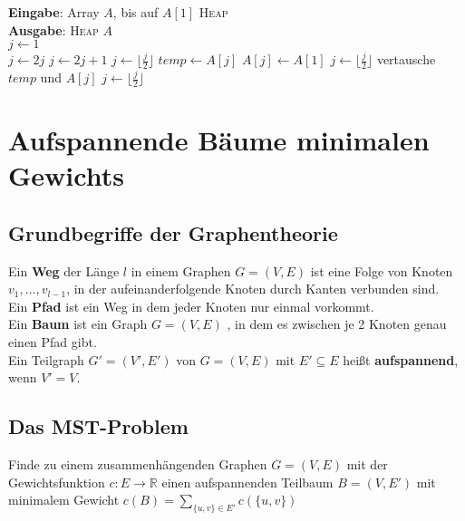 \documentclass[a4paper,10pt]{scrartcl}
\newcommand{\tbf}{\textbf}
\newcommand{\tsc}{\textsc}
\newcommand{\agn}{\leftarrow}
\newcommand{\Gr}{$G = (V,E)$ }
\newcommand{\Gwfkt}{$c: E \rightarrow \mathbb{R}$ }
\newcommand{\Eingabe}[1]{\STATE \tbf{Eingabe}: #1 \\}
\newcommand{\Ausgabe}[1]{\STATE \tbf{Ausgabe}: #1 \\}
\begin{document}
\begin{algorithm}
\caption{$\tsc{Bottom-Up-Heapify}(A,1)$ $\in O(\text{log } n)$}
\begin{algorithmic}
\Eingabe{Array $A$, bis auf $A[1]$ \tsc{Heap}}
\Ausgabe{\tsc{Heap} $A$}
\STATE $j \agn 1$ \\
		\STATE $j \agn 2j$
	\ELSE
		\STATE $j \agn 2j + 1$
	\ENDIF
\ENDWHILE
{}
	\STATE $j \agn \lfloor \frac{j}{2} \rfloor$
\ENDWHILE
\STATE $temp \agn A[j]$
\STATE $A[j] \agn A[1]$
\STATE $j \agn \lfloor \frac{j}{2} \rfloor$
	\STATE vertausche $temp$ und $A[j]$
	\STATE $j \agn \lfloor \frac{j}{2} \rfloor$
\ENDWHILE
\end{algorithmic}
\end{algorithm}


\newpage
\section{Aufspannende Bäume minimalen Gewichts}
\subsection{Grundbegriffe der Graphentheorie}

Ein \tbf{Weg} der Länge $l$ in einem Graphen \Gr ist eine Folge von Knoten $v_1, \ldots, v_{l-1}$, in der aufeinanderfolgende Knoten durch Kanten verbunden sind. \\

Ein \tbf{Pfad} ist ein Weg in dem jeder Knoten nur einmal vorkommt. \\

Ein \tbf{Baum} ist ein Graph \Gr, in dem es zwischen je 2 Knoten genau einen Pfad gibt. \\

Ein Teilgraph $G' = (V',E')$ von \Gr mit $E' \subseteq E$ heißt \tbf{aufspannend}, wenn $V' = V$. \\

\subsection{Das MST-Problem}
Finde zu einem zusammenhängenden Graphen \Gr mit der Gewichtsfunktion \Gwfkt einen aufspannenden Teilbaum $B = (V,E')$ mit minimalem Gewicht $c(B) = \sum_{\{u,v\} \in E'} \limits c(\{u,v\})$ \\
\end{document}
